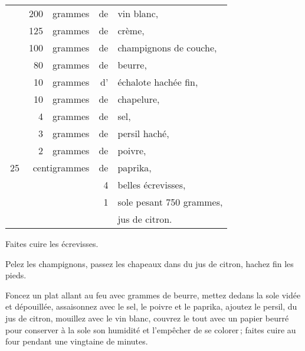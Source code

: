 \setlength\tabcolsep{.15em}
\footnotesize
\begin{longtable}{rrrrp{16em}}
  & 200 & grammes & de & vin blanc,                                                                       \\
  & 125 & grammes & de & crème,                                                                           \\
  & 100 & grammes & de & champignons de couche,                                                           \\
  &  80 & grammes & de & beurre,                                                                          \\
  &  10 & grammes & d' & échalote hachée fin,                                                             \\
  &  10 & grammes & de & chapelure,                                                                       \\
  &   4 & grammes & de & sel,                                                                             \\
  &   3 & grammes & de & persil haché,                                                                    \\
  &   2 & grammes & de & poivre,                                                                          \\
  25 & \multicolumn{2}{r}{centigrammes} & de & paprika,                                                   \\
  &     &         &  4 & belles écrevisses,                                                               \\
  &     &         &  1 & sole pesant 750 grammes,                                                         \\
  &     &         &    & jus de citron.                                                                   \\
\end{longtable}
\normalsize

Faites cuire les écrevisses.

Pelez les champignons, passez les chapeaux dans du jus de citron, hachez fin
les pieds.

Foncez un plat allant au feu avec {\mmm} grammes de beurre, mettez dedans la sole
vidée et dépouillée, assaisonnez avec le sel, le poivre et le paprika, ajoutez
le persil, du jus de citron, mouillez avec le vin blanc, couvrez le tout avec
un papier beurré pour conserver à la sole son humidité et l'empêcher de se
colorer ; faites cuire au four pendant une vingtaine de minutes.

